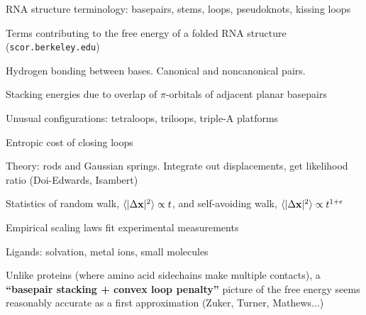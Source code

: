\documentclass{beamer}
\begin{document}
\begin{frame}{}

\itemb
\item RNA structure terminology: basepairs, stems, loops, pseudoknots, kissing loops
\iteme
\end{frame}

\begin{frame}{}

Terms contributing to the free energy of a folded RNA structure ({\tt scor.berkeley.edu})
 \itemb
 \item Hydrogen bonding between bases. Canonical and noncanonical pairs.
 \item Stacking energies due to overlap of $\pi$-orbitals of adjacent planar basepairs
 \item Unusual configurations: tetraloops, triloops, triple-A platforms
 \item Entropic cost of closing loops
  \itemb
  \item Theory: rods and Gaussian springs. Integrate out displacements, get likelihood ratio (Doi-Edwards, Isambert)
  \item Statistics of random walk, $\langle |\Delta {\bf x}|^2 \rangle \propto t$, and self-avoiding walk, $\langle |\Delta {\bf x}|^2 \rangle \propto t^{1+\epsilon}$
  \item Empirical scaling laws fit experimental measurements
  \iteme
 \item Ligands: solvation, metal ions, small molecules
 \item Unlike proteins (where amino acid sidechains make multiple contacts),
a {\bf ``basepair stacking + convex loop penalty''} picture of the free energy seems reasonably accurate as a first approximation
(Zuker, Turner, Mathews...)
 \iteme
\end{frame}
\end{document}
